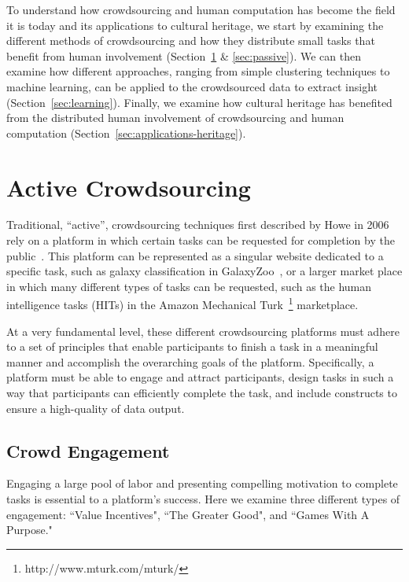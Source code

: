 \documentclass[10pt,twocolumn]{article}
\begin{document}
To understand how crowdsourcing and human computation has become the field 
it is today and its applications to cultural heritage, we start by 
examining the different methods of crowdsourcing and how they distribute 
small tasks that benefit from human involvement (Section~\ref{sec:active} 
\& \ref{sec:passive}). We can then examine how different approaches, ranging 
from simple clustering techniques to machine learning, can be applied to the 
crowdsourced data to extract insight (Section~\ref{sec:learning}). %
Finally, we examine how cultural heritage has benefited from the distributed human 
involvement of crowdsourcing and human computation 
(Section~\ref{sec:applications-heritage}).

\section{Active Crowdsourcing}
\label{sec:active}

Traditional, ``active'', crowdsourcing techniques first described by Howe in 
2006 rely on a platform in which certain tasks can be requested for completion 
by the public~\cite{Howe2006}. This platform can be represented as a singular 
website dedicated to a specific task, such as galaxy classification in 
GalaxyZoo~\cite{Lintott2008}, or a larger market place in which many different 
types of tasks can be requested, such as the human intelligence tasks (HITs) 
in the Amazon Mechanical Turk~\footnote{http://www.mturk.com/mturk/} marketplace.

At a very fundamental level, these different crowdsourcing platforms must adhere to a 
set of principles that enable participants to finish a task in a meaningful manner 
and accomplish the overarching goals of the platform. Specifically, a platform must
be able to engage and attract participants, design tasks in such a 
way that participants can efficiently complete the task, and include constructs 
to ensure a high-quality of data output.

\subsection{Crowd Engagement}
\label{sec:engagement}

Engaging a large pool of labor and presenting compelling motivation to complete
tasks is essential to a platform's success. Here we examine three different
types of engagement: ``Value Incentives", ``The Greater Good", and ``Games With A 
Purpose."
\end{document}
